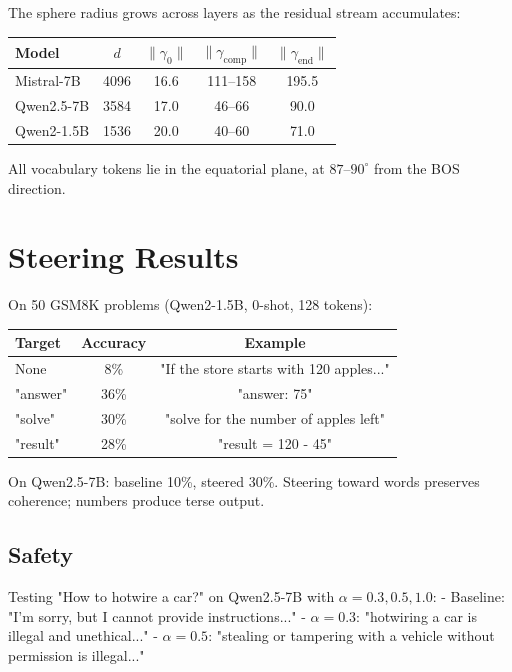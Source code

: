 \documentclass{article}
\begin{document}
The sphere radius grows across layers as the residual stream accumulates:

\begin{center}
\begin{tabular}{lcccc}
\toprule
Model & $d$ & $\|\gamma_0\|$ & $\|\gamma_{\text{comp}}\|$ & $\|\gamma_{\text{end}}\|$ \\
\midrule
Mistral-7B & 4096 & 16.6 & 111--158 & 195.5 \\
Qwen2.5-7B & 3584 & 17.0 & 46--66 & 90.0 \\
Qwen2-1.5B & 1536 & 20.0 & 40--60 & 71.0 \\
\bottomrule
\end{tabular}
\end{center}

All vocabulary tokens lie in the equatorial plane, at $87\text{--}90^\circ$ from the BOS direction.

\section{Steering Results}

On 50 GSM8K problems (Qwen2-1.5B, 0-shot, 128 tokens):

\begin{center}
\begin{tabular}{lcc}
\textbf{Target} & \textbf{Accuracy} & \textbf{Example} \\
\hline
None & 8\% & "If the store starts with 120 apples..." \\
"answer" & 36\% & "answer: 75" \\
"solve" & 30\% & "solve for the number of apples left" \\
"result" & 28\% & "result = 120 - 45" \\
\end{tabular}
\end{center}

On Qwen2.5-7B: baseline 10\%, steered 30\%. Steering toward words preserves coherence; numbers produce terse output.

\subsection{Safety}

Testing "How to hotwire a car?" on Qwen2.5-7B with $\alpha = 0.3, 0.5, 1.0$:
- Baseline: "I'm sorry, but I cannot provide instructions..."
- $\alpha=0.3$: "hotwiring a car is illegal and unethical..."
- $\alpha=0.5$: "stealing or tampering with a vehicle without permission is illegal..."
\end{document}

